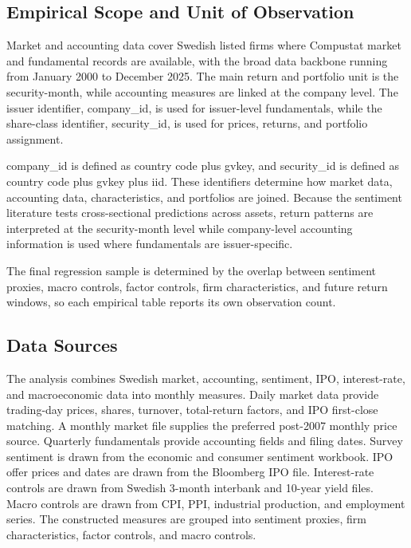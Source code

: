 \documentclass[11pt]{article}
\newcommand{\repo}[1]{\textnormal{\small #1}}
\begin{document}
\subsection{Empirical Scope and Unit of Observation}
Market and accounting data cover Swedish listed firms where Compustat market and fundamental records are available, with the broad data backbone running from January 2000 to December 2025. The main return and portfolio unit is the security-month, while accounting measures are linked at the company level. The issuer identifier, \repo{company\_id}, is used for issuer-level fundamentals, while the share-class identifier, \repo{security\_id}, is used for prices, returns, and portfolio assignment.

\repo{company\_id} is defined as country code plus \repo{gvkey}, and \repo{security\_id} is defined as country code plus \repo{gvkey} plus \repo{iid}. These identifiers determine how market data, accounting data, characteristics, and portfolios are joined. Because the sentiment literature tests cross-sectional predictions across assets, return patterns are interpreted at the security-month level while company-level accounting information is used where fundamentals are issuer-specific.

The final regression sample is determined by the overlap between sentiment proxies, macro controls, factor controls, firm characteristics, and future return windows, so each empirical table reports its own observation count.

\subsection{Data Sources}
The analysis combines Swedish market, accounting, sentiment, IPO, interest-rate, and macroeconomic data into monthly measures. Daily market data provide trading-day prices, shares, turnover, total-return factors, and IPO first-close matching. A monthly market file supplies the preferred post-2007 monthly price source. Quarterly fundamentals provide accounting fields and filing dates. Survey sentiment is drawn from the economic and consumer sentiment workbook. IPO offer prices and dates are drawn from the Bloomberg IPO file. Interest-rate controls are drawn from Swedish 3-month interbank and 10-year yield files. Macro controls are drawn from CPI, PPI, industrial production, and employment series. The constructed measures are grouped into sentiment proxies, firm characteristics, factor controls, and macro controls.
\end{document}
